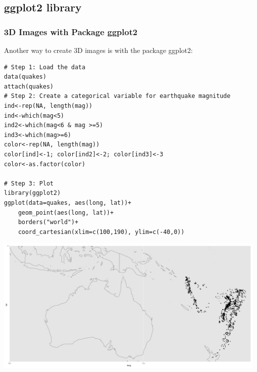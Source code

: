 \subsection{\ttfamily ggplot2 \normalfont library} 
\begin{frame}
\frametitle{3D Images with Package \ttfamily ggplot2 \normalfont}

Another way to create 3D images is with the package \ttfamily ggplot2: \normalfont 

\begin{lstlisting}
# Step 1: Load the data
data(quakes)
attach(quakes)
# Step 2: Create a categorical variable for earthquake magnitude
ind<-rep(NA, length(mag))
ind<-which(mag<5)
ind2<-which(mag<6 & mag >=5)
ind3<-which(mag>=6)
color<-rep(NA, length(mag))
color[ind]<-1; color[ind2]<-2; color[ind3]<-3
color<-as.factor(color)

# Step 3: Plot
library(ggplot2)
ggplot(data=quakes, aes(long, lat))+
	geom_point(aes(long, lat))+
	borders("world")+
	coord_cartesian(xlim=c(100,190), ylim=c(-40,0))
\end{lstlisting}

\newpage
       \begin{center}
		\includegraphics[scale=0.22]{images/ggplotPlot1.pdf}
	\end{center}
\end{frame}

